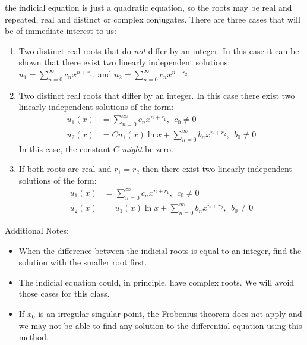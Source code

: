  the indicial equation is just a quadratic equation, so the roots may be real and repeated, real and distinct or complex conjugates.  There are three cases that will be of immediate interest to us:
\begin{enumerate}
\item Two distinct real roots that do \emph{not} differ by an integer.  In this case it can be shown that there exist two linearly independent solutions: $u_1 = \sum_{n=0}^{\infty}c_nx^{n+r_1}$, and $u_2 = \sum_{n=0}^{\infty}c_nx^{n+r_2}$.
\item Two distinct real roots that differ by an integer.  In this case there exist two linearly independent solutions of the form:
\begin{align*}
u_1(x) &= \sum\limits_{n=0}^{\infty}c_nx^{n+r_1}, \ \ c_0 \ne 0 \\
u_2(x) &= C u_1(x) \ln{x} + \sum\limits_{n=0}^{\infty}b_nx^{n+r_2}, \ \ b_0 \ne 0 
\end{align*}
In this case, the constant $C$ \emph{might} be zero.
\item If both roots are real and $r_1 = r_2$ then there exist two linearly independent solutions of the form:
\begin{align*}
u_1(x) &= \sum\limits_{n=0}^{\infty}c_nx^{n+r_1}, \ \ c_0 \ne 0 \\
u_2(x) &= u_1(x) \ln{x} + \sum\limits_{n=0}^{\infty}b_nx^{n+r_2}, \ \ b_0 \ne 0
\end{align*}
\end{enumerate}

\noindent Additional Notes:

\begin{itemize}
\item When the difference between the indicial roots is equal to an integer, find the solution with the smaller root first.

\item The indicial equation could, in principle, have complex roots.  We will avoid those cases for this class.

\item If $x_0$ is an irregular singular point, the Frobenius theorem does not apply and we may not be able to find any solution to the differential equation using this method.
\end{itemize}
